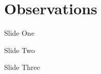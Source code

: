 \section{Observations}

\begin{frame}{Slide One}

\end{frame}

\begin{frame}{Slide Two}

\end{frame}

\begin{frame}{Slide Three}

\end{frame}